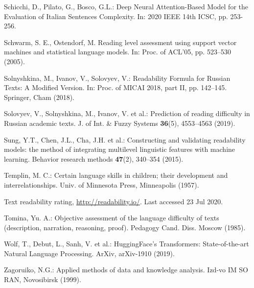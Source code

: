 \documentclass[runningheads]{llncs}
\begin{document}
\begin{thebibliography}{37}
Schicchi, D., Pilato, G., Bosco, G.L.: Deep Neural Attention-Based Model for the Evaluation of Italian Sentences Complexity. In: 2020 IEEE 14th ICSC, pp. 253-256. 

Schwarm, S. E., Ostendorf, M. Reading level assessment using support vector machines and statistical language models. In: Proc. of ACL’05, pp. 523--530 (2005). 

Solnyshkina, M., Ivanov, V., Solovyev, V.: Readability Formula for Russian Texts: A Modified Version. In: Proc. of MICAI 2018, part II, pp. 142--145. Springer, Cham (2018). 

Solovyev, V., Solnyshkina, M., Ivanov, V. et al.: Prediction of reading difficulty in Russian academic texts. J. of Int. \& Fuzzy Systems \textbf{36}(5), 4553--4563 (2019). 

Sung, Y.T., Chen, J.L., Cha, J.H. et al.: Constructing and validating readability models: the method of integrating multilevel linguistic features with machine learning. Behavior research methods \textbf{47}(2), 340--354 (2015). 

Templin, M. C.: Certain language skills in children; their development and interrelationships. Univ. of Minnesota Press, Minneapolis (1957).

Text readability rating, \url{http://readability.io/}. Last accessed 23 Jul 2020.

Tomina, Yu. A.: Objective assessment of the language difficulty of texts (description, narration, reasoning, proof). Pedagogy Cand. Diss. Moscow (1985).

Wolf, T., Debut, L., Sanh, V. et al.: HuggingFace's Transformers: State-of-the-art Natural Language Processing. ArXiv, arXiv-1910 (2019).

Zagoruiko, N.G.: Applied methods of data and knowledge analysis. Izd-vo IM SO RAN, Novosibirsk (1999).

\end{thebibliography}
\end{document}
